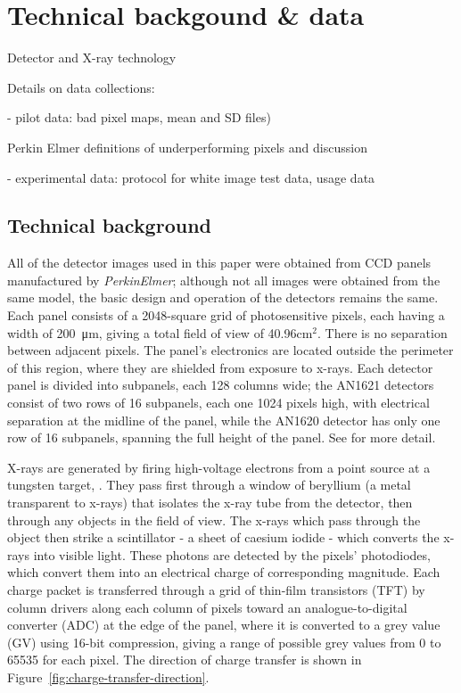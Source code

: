 \documentclass[\main/IO-Pixels.tex]{subfiles}
\begin{document}
 
 
\section{Technical backgound \& data}
\begin{outline}
Detector and X-ray technology

Details on data collections: 

- pilot data: bad pixel maps, mean and SD files)

  Perkin Elmer definitions of underperforming pixels and discussion
  
- experimental data: protocol for white image test data, usage data
\end{outline}

\subsection{Technical background}

All of the detector images used in this paper were obtained from CCD panels manufactured by \textit{PerkinElmer}; although not all images were obtained from the same model, the basic design and operation of the detectors remains the same. Each panel consists of a 2048-square grid of photosensitive pixels, each having a width of \SI{200}{\micro\meter}, giving a total field of view of 40.96cm$^2$. There is no separation between adjacent pixels. The panel's electronics are located outside the perimeter of this region, where they are shielded from exposure to x-rays. Each detector panel is divided into subpanels, each 128 columns wide; the AN1621 detectors consist of two rows of 16 subpanels, each one 1024 pixels high, with electrical separation at the midline of the panel, while the AN1620 detector has only one row of 16 subpanels, spanning the full height of the panel. See \cite{PerkinElmerManual} for more detail.

X-rays are generated by firing high-voltage electrons from a point source  at a tungsten target, . They pass first through a window of beryllium (a metal transparent to x-rays) that isolates the x-ray tube from the detector, then through any objects in the field of view. The x-rays which pass through the object then strike a scintillator - a sheet of caesium iodide - which converts the x-rays into visible light. These photons are detected by the pixels' photodiodes, which convert them into an electrical charge of corresponding magnitude. Each charge packet is transferred through a grid of thin-film transistors (TFT) by column drivers  along each column of pixels toward an analogue-to-digital converter (ADC) at the edge of the panel, where it is converted to a grey value (GV) using 16-bit compression, giving a range of possible grey values from 0 to 65535 for each pixel. The direction of charge transfer is shown in Figure~\ref{fig:charge-transfer-direction}. 
\end{document}

